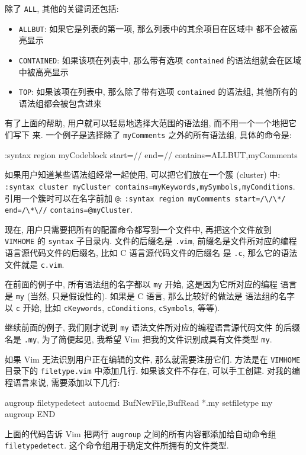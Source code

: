 除了 \texttt{ALL}, 其他的关键词还包括:
\begin{itemize}
    \item \texttt{ALLBUT}: 如果它是列表的第一项, 那么列表中的其余项目在区域中
        都不会被高亮显示
    \item \texttt{CONTAINED}: 如果该项在列表中, 那么带有选项 \texttt{contained}
        的语法组就会在区域中被高亮显示
    \item \texttt{TOP}: 如果该项在列表中, 那么除了带有选项 \texttt{contained}
        的语法组, 其他所有的语法组都会被包含进来
\end{itemize}

有了上面的帮助, 用户就可以轻易地选择大范围的语法组, 而不用一个一个地把它们写下
来. 一个例子是选择除了 \texttt{myComments} 之外的所有语法组, 具体的命令是:
\begin{vimcode}
:syntax region myCodeblock start=/{/ end=/}/ contains=ALLBUT,myComments
\end{vimcode}

\begin{tips}
    如果用户知道某些语法组经常一起使用, 可以把它们放在一个簇 (cluster) 中:
    \texttt{:syntax cluster myCluster
    contains=myKeywords,mySymbols,myConditions}. 引用一个簇时可以在名字前加
    \verb'@': \texttt{:syntax region myComments start=}\verb'/\/\*/ end=/\*\//'
        \texttt{contains=@myCluster}.
\end{tips}

现在, 用户只需要把所有的配置命令都写到一个文件中, 再把这个文件放到
\texttt{VIMHOME} 的 \texttt{syntax} 子目录内. 文件的后缀名是 \texttt{.vim},
前缀名是文件所对应的编程语言源代码文件的后缀名, 比如 C 语言源代码文件的后缀名
是 \texttt{.c}, 那么它的语法文件就是 \texttt{c.vim}.

在前面的例子中, 所有语法组的名字都以 \texttt{my} 开始, 这是因为它所对应的编程
语言是 \texttt{my} (当然, 只是假设性的). 如果是 C 语言, 那么比较好的做法是
语法组的名字以 \texttt{c} 开始, 比如 \texttt{cKeywords}, \texttt{cConditions},
\texttt{cSymbols}, 等等).

继续前面的例子, 我们刚才说到 \texttt{my} 语法文件所对应的编程语言源代码文件
的后缀名是 \texttt{.my}, 为了简便起见, 我希望 Vim 把我的文件识别成具有文件类型
\texttt{my}.

如果 Vim 无法识别用户正在编辑的文件, 那么就需要注册它们. 方法是在
\texttt{VIMHOME} 目录下的 \texttt{filetype.vim} 中添加几行. 如果该文件不存在,
可以手工创建. 对我的编程语言来说, 需要添加以下几行:
\begin{vimcode}
augroup filetypedetect
autocmd BufNewFile,BufRead *.my setfiletype my
augroup END
\end{vimcode}
上面的代码告诉 Vim 把两行 \texttt{augroup} 之间的所有内容都添加给自动命令组
\texttt{filetypedetect}. 这个命令组用于确定文件所拥有的文件类型.

